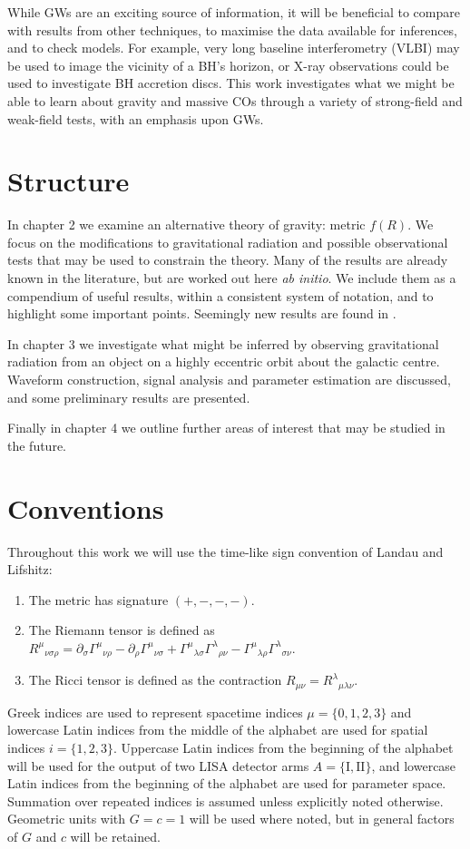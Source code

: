 While GWs are an exciting source of information, it will be beneficial to compare with results from other techniques, to maximise the data available for inferences, and to check models. For example, very long baseline interferometry (VLBI) may be used to image the vicinity of a BH's horizon, or X-ray observations could be used to investigate BH accretion discs\cite{Psaltis2008}. This work investigates what we might be able to learn about gravity and massive COs through a variety of strong-field and weak-field tests, with an emphasis upon GWs.

\section{Structure}

In chapter 2 we examine an alternative theory of gravity: metric $f(R)$. We focus on the modifications to gravitational radiation and possible observational tests that may be used to constrain the theory. Many of the results are already known in the literature, but are worked out here {\it ab initio}. We include them as a compendium of useful results, within a consistent system of notation, and to highlight some important points. Seemingly new results are found in .

In chapter 3 we investigate what might be inferred by observing gravitational radiation from an object on a highly eccentric orbit about the galactic centre. Waveform construction, signal analysis and parameter estimation are discussed, and some preliminary results are presented.

Finally in chapter 4 we outline further areas of interest that may be studied in the future.

\section{Conventions}

Throughout this work we will use the time-like sign convention of Landau and Lifshitz\cite{Landau1975}:
\begin{enumerate}
\item The metric has signature $(+,-,-,-)$.
\item The Riemann tensor is defined as ${R^\mu}_{\nu\sigma\rho} = \partial_\sigma {\Gamma^\mu}_{\nu\rho} - \partial_\rho {\Gamma^\mu}_{\nu\sigma} + {\Gamma^\mu}_{\lambda\sigma}{\Gamma^\lambda}_{\rho\nu} - {\Gamma^\mu}_{\lambda\rho}{\Gamma^\lambda}_{\sigma\nu}$.
\item The Ricci tensor is defined as the contraction $R_{\mu\nu} = {R^\lambda}_{\mu\lambda\nu}$.
\end{enumerate}
Greek indices are used to represent spacetime indices $\mu = \{0,1,2,3\}$ and lowercase Latin indices from the middle of the alphabet are used for spatial indices $i = \{1,2,3\}$. Uppercase Latin indices from the beginning of the alphabet will be used for the output of two LISA detector arms $A = \{\mathrm{I}, \mathrm{II}\}$, and lowercase Latin indices from the beginning of the alphabet are used for parameter space. Summation over repeated indices is assumed unless explicitly noted otherwise. Geometric units with $G = c = 1$ will be used where noted, but in general factors of $G$ and $c$ will be retained.

